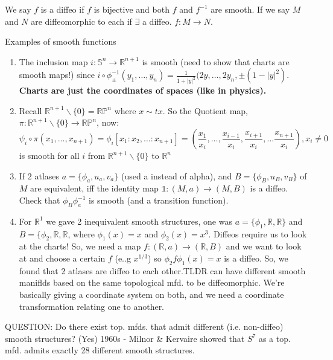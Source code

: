 \documentclass[12pt,letterpaper]{article}
\begin{document}
We say $f$ is a diffeo if $f$ is bijective and both $f$ and $f^{-1}$ are smooth. If we say $M$ and $N$ are diffeomorphic to each if $\exists$ a diffeo. $f: M \rightarrow N$.

Examples of smooth functions
\begin{enumerate}
    \item The inclusion map $i: \mathbb{S}^n \rightarrow \mathbb{R}^{n+1}$ is smooth (need to show that charts are smooth maps!) since $i \circ \phi^{-1}_{\pm} (y_1, \dots, y_n) = \frac{1}{1+|y|^2}(2y, \dots, 2y_n, \pm (1 - |y|^2)$. \textbf{Charts are just the coordinates of spaces (like in physics).}
    \item Recall $\mathbb{R}^{n+1} \backslash \{0\} = \mathbb{R}\mathbb{P}^n$ where $ x \sim tx$. So the Quotient map, $\pi: \mathbb{R}^{n+1} \backslash \{0\} \rightarrow \mathbb{R}\mathbb{P}^n$, now:
    \begin{equation}
        \psi_i \circ \pi(x_1, \dots, x_{n+1} ) = \phi_i [x_1:x_2, \dots : x_{n+1}] = (\frac{x_1}{x_i}, \dots, \frac{x_{i-1}}{x_i}, \frac{x_{i+1}}{x_i}, \dots \frac{x_{n+1}}{x_i}), x_i \neq 0
    \end{equation} is smooth for all $i$ from $\mathbb{R}^{n+1} \backslash \{0\}$ to $\mathbb{R}^n$
    \item If 2 atlases $a = \{ \phi_a, u_a, v_a\}$ (used a instead of alpha), and $B = \{ \phi_B, u_B, v_B\}$ of $M$ are equivalent, iff the identity map $\mathbb{1} : (M,a) \rightarrow (M, B)$ is a diffeo. Check that $\phi_B \phi_a^{-1}$ is smooth (and a transition function).
    \item For $\mathbb{R}^1$ we gave 2 inequivalent smooth structures, one was $a = \{ \phi_1, \mathbb{R}, \mathbb{R}\}$ and $B = \{ \phi_2, \mathbb{R}, \mathbb{R}$, where $\phi_1(x)=x$ and $\phi_2(x)=x^3$. Diffeos require us to look at the charts! So, we need a map $f:(\mathbb{R}, a) \rightarrow (\mathbb{R}, B)$ and we want to look at and choose a certain $f$ (e..g $x^{1/3}$) so $\phi_2 f \phi_1(x) = x$ is a diffeo. So, we found that 2 atlases are diffeo to each other.TLDR can have different smooth maniflds based on the same topological mfd. to be diffeomorphic. We're basically giving a coordinate system on both, and we need a coordinate transformation relating one to another.
\end{enumerate}
QUESTION: Do there exist top. mfds. that admit different (i.e. non-diffeo) smooth structures? (Yes) 1960s - Milnor & Kervaire showed that $S^7$ as a top. mfd. admits exactly 28 different smooth structures.
\end{document}
